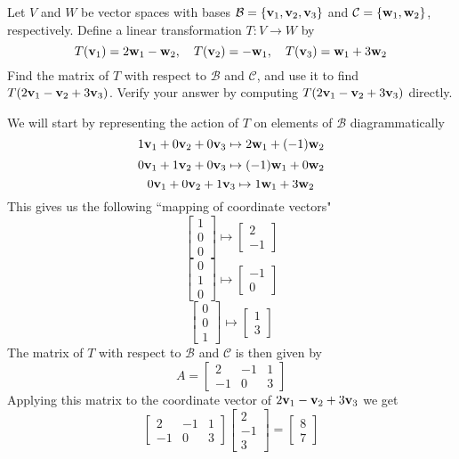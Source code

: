 \documentclass{ximera}
\renewcommand{\vec}[1]{{\bf #1}}
\begin{document}
\begin{example}\label{ex:transmatrix1}
Let $V$ and $W$ be vector spaces with bases $\mathcal{B}=\{\vec{v}_1, \vec{v}_2, \vec{v}_3\}$ and $\mathcal{C}=\{\vec{w}_1, \vec{w}_2\}$, respectively.  Define a linear transformation $T:V\rightarrow W$ by $$T(\vec{v}_1)=2\vec{w}_1-\vec{w}_2,\quad T(\vec{v}_2)=-\vec{w}_1,\quad T(\vec{v}_3)=\vec{w}_1+3\vec{w}_2$$
Find the matrix of $T$ with respect to $\mathcal{B}$ and $\mathcal{C}$, and use it to find $T(2\vec{v}_1-\vec{v}_2+3\vec{v}_3)$.  Verify your answer by computing $T(2\vec{v}_1-\vec{v}_2+3\vec{v}_3)$ directly.

\begin{explanation}
We will start by representing the action of $T$ on elements of $\mathcal{B}$ diagrammatically
$$1\vec{v}_1+0\vec{v}_2+0\vec{v}_3\mapsto 2\vec{w}_1+(-1)\vec{w}_2$$
$$0\vec{v}_1+1\vec{v}_2+0\vec{v}_3\mapsto (-1)\vec{w}_1+0\vec{w}_2$$
$$0\vec{v}_1+0\vec{v}_2+1\vec{v}_3\mapsto 1\vec{w}_1+3\vec{w}_2$$
This gives us the following ``mapping of coordinate vectors"
$$\begin{bmatrix}1\\0\\0\end{bmatrix}\mapsto \begin{bmatrix}2\\-1\end{bmatrix}$$
$$\begin{bmatrix}0\\1\\0\end{bmatrix}\mapsto \begin{bmatrix}-1\\0\end{bmatrix}$$
$$\begin{bmatrix}0\\0\\1\end{bmatrix}\mapsto \begin{bmatrix}1\\3\end{bmatrix}$$
The matrix of $T$ with respect to $\mathcal{B}$ and $\mathcal{C}$ is then given by
$$A=\begin{bmatrix}2&-1&1\\-1&0&3\end{bmatrix}$$
Applying this matrix to the coordinate vector of $2\vec{v}_1-\vec{v}_2+3\vec{v}_3$ we get
$$\begin{bmatrix}2&-1&1\\-1&0&3\end{bmatrix}\begin{bmatrix}2\\-1\\3\end{bmatrix}=\begin{bmatrix}8\\7\end{bmatrix}$$


\end{explanation}
\end{example}
\end{document}
